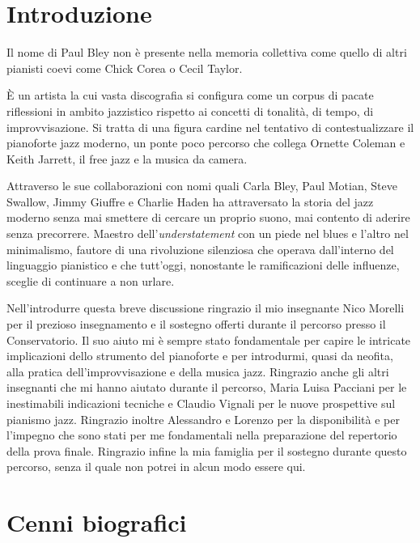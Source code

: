 \frontmatter
\setcounter{page}{1}
\tableofcontents
\chapter{Introduzione}
Il nome di Paul Bley non è presente nella memoria collettiva come quello di altri pianisti coevi come Chick Corea o Cecil Taylor.\par
 È un artista la cui vasta discografia si configura come un corpus di pacate riflessioni in ambito jazzistico rispetto ai concetti di tonalità, di tempo, di improvvisazione. Si tratta di una figura cardine nel tentativo di contestualizzare il pianoforte jazz moderno, un ponte poco percorso che collega Ornette Coleman e Keith Jarrett, il free jazz e la musica da camera.\par
 Attraverso le sue collaborazioni con nomi quali Carla Bley, Paul Motian, Steve Swallow, Jimmy Giuffre e Charlie Haden ha attraversato la storia del jazz moderno senza mai smettere di cercare un proprio suono, mai contento di aderire senza precorrere. Maestro dell'\textit{understatement} con un piede nel blues e l'altro nel minimalismo, fautore di una rivoluzione silenziosa che operava dall'interno del linguaggio pianistico e che tutt'oggi, nonostante le ramificazioni delle influenze, sceglie di continuare a non urlare.\par
Nell'introdurre questa breve discussione ringrazio il mio insegnante Nico Morelli per il prezioso insegnamento e il sostegno offerti durante il percorso presso il Conservatorio. Il suo aiuto mi è sempre stato fondamentale per capire le intricate implicazioni dello strumento del pianoforte e per introdurmi, quasi da neofita, alla pratica dell'improvvisazione e della musica jazz. Ringrazio anche gli altri insegnanti che mi hanno aiutato durante il percorso, Maria Luisa Pacciani per le inestimabili indicazioni tecniche e Claudio Vignali per le nuove prospettive sul pianismo jazz. Ringrazio inoltre Alessandro e Lorenzo per la disponibilità e per l'impegno che sono stati per me fondamentali nella preparazione del repertorio della prova finale. Ringrazio infine la mia famiglia per il sostegno durante questo percorso, senza il quale non potrei in alcun modo essere qui.
\mainmatter
\setcounter{page}{1}
\pagestyle{fancy}
\makeatletter
\let\ps@plain\ps@fancy
\makeatother
\chapter{Cenni biografici}
